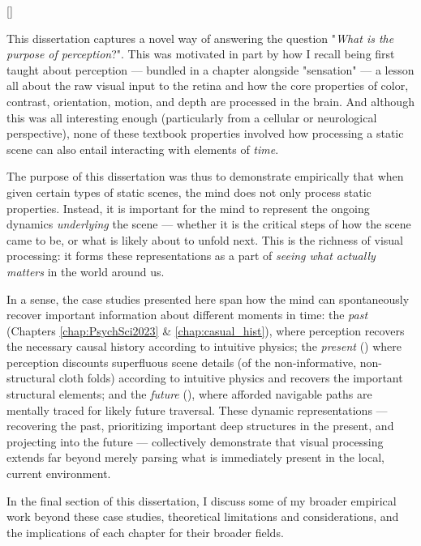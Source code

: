[]

This dissertation captures a novel way of answering the question "\textit{What is the purpose of perception}?". This was motivated in part by how I recall being first taught about perception --- bundled in a chapter alongside "sensation" --- a lesson all about the raw visual input to the retina and how the core properties of color, contrast, orientation, motion, and depth are processed in the brain. And although this was all interesting enough (particularly from a cellular or neurological perspective), none of these textbook properties involved how processing a static scene can also entail interacting with elements of \textit{time}. 

The purpose of this dissertation was thus to demonstrate empirically that when given certain types of static scenes, the mind does not only process static properties. Instead, it is important for the mind to represent the ongoing dynamics \textit{underlying} the scene --- whether it is the critical steps of how the scene came to be, or what is likely about to unfold next. This is the richness of visual processing: it forms these representations as a part of \textit{seeing what actually matters} in the world around us.

In a sense, the case studies presented here span how the mind can spontaneously recover important information about different moments in time: the \textit{past} (Chapters \ref{chap:PsychSci2023} \& \ref{chap:casual_hist}), where perception recovers the necessary causal history according to intuitive physics;  the \textit{present} () where perception discounts superfluous scene details (of the non-informative, non-structural cloth folds) according to intuitive physics and recovers the important structural elements; and the \textit{future} (), where afforded navigable paths are mentally traced for likely future traversal.  These dynamic representations --- recovering the past, prioritizing important deep structures in the present, and projecting into the future --- collectively demonstrate that visual processing extends far beyond merely parsing what is immediately present in the local, current environment. 

In the final section of this dissertation, I discuss some of my broader empirical work beyond these case studies, theoretical limitations and considerations, and the implications of each chapter for their broader fields.

